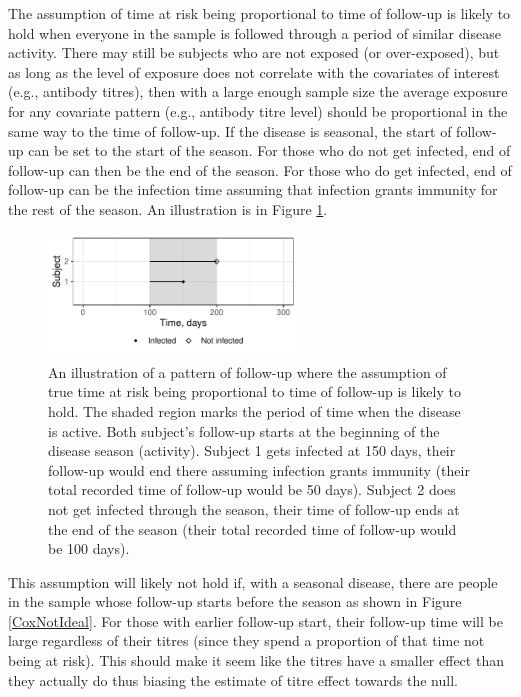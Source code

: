 The assumption of time at risk being proportional to time of follow-up is likely to hold when everyone in the sample is followed through a period of similar disease activity. There may still be subjects who are not exposed (or over-exposed), but as long as the level of exposure does not correlate with the covariates of interest (e.g., antibody titres), then with a large enough sample size the average exposure for any covariate pattern (e.g., antibody titre level) should be proportional in the same way to the time of follow-up. If the disease is seasonal, the start of follow-up can be set to the start of the season. For those who do not get infected, end of follow-up can then be the end of the season. For those who do get infected, end of follow-up can be the infection time assuming that infection grants immunity for the rest of the season. An illustration is in Figure \ref{CoxIdeal}.

\begin{figure}[htp]
	\centering
	\includegraphics[width=0.59\textwidth]{../curve-cox/timeplot_3_light.pdf}
	\caption{
		An illustration of a pattern of follow-up where the assumption of true time at risk being proportional to time of follow-up is likely to hold. The shaded region marks the period of time when the disease is active. Both subject's follow-up starts at the beginning of the disease season (activity). Subject 1 gets infected at 150 days, their follow-up would end there assuming infection grants immunity (their total recorded time of follow-up would be 50 days). Subject 2 does not get infected through the season, their time of follow-up ends at the end of the season (their total recorded time of follow-up would be 100 days).
	}
	\label{CoxIdeal}
\end{figure}

This assumption will likely not hold if, with a seasonal disease, there are people in the sample whose follow-up starts before the season as shown in Figure \ref{CoxNotIdeal}. For those with earlier follow-up start, their follow-up time will be large regardless of their titres (since they spend a proportion of that time not being at risk). This should make it seem like the titres have a smaller effect than they actually do thus biasing the estimate of titre effect towards the null.

